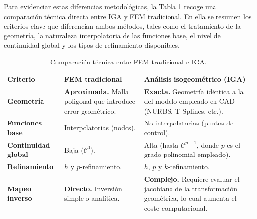 \documentclass[11pt]{book}
\theoremstyle{plain} %
\theoremstyle{definition} %
\theoremstyle{definition} %
\begin{document}
\vspace{-0.05cm}

Para evidenciar estas diferencias metodológicas, la Tabla \ref{tab:fem_vs_iga} recoge una comparación técnica directa entre IGA y FEM tradicional. En ella se resumen los criterios clave que diferencian ambos métodos, tales como el tratamiento de la geometría, la naturaleza interpolatoria de las funciones base, el nivel de continuidad global y los tipos de refinamiento disponibles.
\vspace{-0.35cm}

\begin{table}[htbp]
    \centering
    \caption{Comparación técnica entre FEM tradicional e IGA.}
    \label{tab:fem_vs_iga}
    \vspace{-0.15cm}
    \renewcommand{\arraystretch}{1.5}
    \begin{tabular}{p{3cm} p{5.5cm} p{5.5cm}}
        \toprule
        \textbf{Criterio} & \textbf{FEM tradicional} & \textbf{Análisis isogeométrico (IGA)} \\
        \midrule
        
        \textbf{Geometría} & 
        \cellcolor{desventaja} \textbf{Aproximada.} Malla poligonal que introduce error geométrico. & 
        \cellcolor{ventaja} \textbf{Exacta.} Geometría idéntica a la del modelo empleado en CAD (NURBS, T-Splines, etc.). \\
        \midrule
        
        \textbf{Funciones base} & 
        Interpolatorias (nodos). & 
        No interpolatorias (puntos de control). \\
        \midrule
        
        \textbf{Continuidad global} & 
        \cellcolor{desventaja} Baja ($\mathcal{C}^0$). & 
        \cellcolor{ventaja} Alta (hasta $\mathcal{C}^{p-1}$, donde $p$ es el grado polinomial empleado). \\
        \midrule
        
        \textbf{Refinamiento} & 
        $h$ y $p$-refinamiento. & 
        \cellcolor{ventaja} $h$, $p$ y \textbf{$k$}-refinamiento. \\
        \midrule
        
        
        \textbf{Mapeo inverso} & 
        \cellcolor{ventaja} \textbf{Directo.} Inversión simple o analítica.  & 
        \cellcolor{desventaja} \textbf{Complejo.} Requiere evaluar el jacobiano de la transformación geométrica, lo cual aumenta el coste computacional. \\
        \bottomrule
    \end{tabular}
\end{table}
\end{document}
